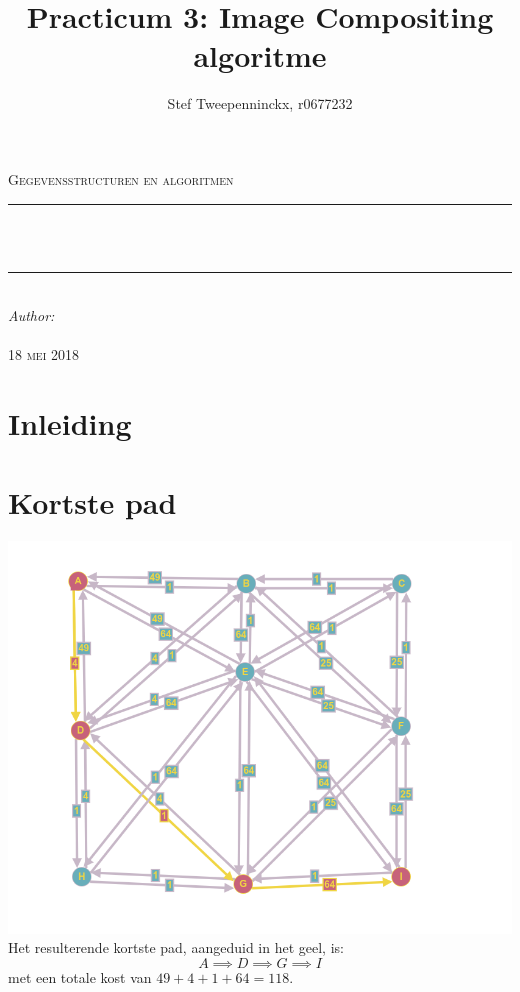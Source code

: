 \documentclass[11pt, a4paper]{article}
\author{Stef Tweepenninckx, r0677232}
\title{Practicum 3: Image Compositing algoritme}
\makeatletter
\def\printtitle{                 
    {\large \@title}}
\def\printauthor{                  
    {\large \@author}}
\makeatother
\begin{document}
\begin{titlepage}
\newcommand{\HRule}{\rule{\linewidth}{0.5mm}} 
\center 
\textsc{\LARGE Gegevensstructuren en algoritmen}\\[1.5cm] 
\HRule \\[0.4cm]

{\huge \bfseries \printtitle}\\[0.4cm] 
\HRule \\[0.4cm]

\Large \emph{Author:}\\
 \textsc{\printauthor}\\[3cm]

{\large \textsc{18 mei 2018}}\\[3cm] 

\vfill 
\end{titlepage}

\section*{Inleiding}

\section*{Kortste pad}
\includegraphics[width=\textwidth]{grafe}
\vspace*{10px}
Het resulterende kortste pad, aangeduid in het geel, is: $$A \implies D \implies G \implies I$$ met een totale kost van $49 + 4 + 1 + 64 = 118$.

\newpage
\end{document}
